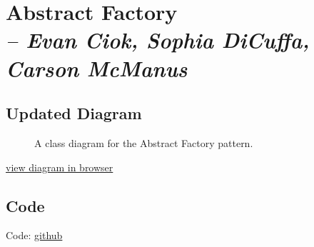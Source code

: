 \chapter{Abstract Factory \\
  \small{\textit{-- Evan Ciok, Sophia DiCuffa, Carson McManus}}
  \label{Chapter::AbstractFactory}}

\section{Updated Diagram}

\begin{figure}[htb]
  \centering
  \caption{\label{Figure::pizzadiagram} A class diagram for the Abstract Factory pattern.}
\end{figure}

\href{https://mermaid.ink/svg/pako:eNrdVslq5DAQ_RWh04R05wM6IZcOAzkkNCQMzOBLRdbIIpZkZBmy9b-PFssjL-3omhhsi1dPtavsd0xUSfEOkxra9oYD0yAKiezlEXTgb29wK5mmJafS_ARilH5F74HjrnNENAVDH6Aj9MfZXHCjOlYtCfYVpe3ill-UMU7bJdGBNg3VSvJFjTWIiB8LmQZy_3s5lK8Xyb7iBJj6LuH4OEZuPxjNJUMSBL20XBNQ7y0q3TNBfXCodc8EDQEg4l8pbt1wZsVlau8JnqfBdmYMPKmXMdDYsOw9BnvHGTX31vdFmVFhcbK2zuM0Jd5UA_9NHVN-qEc-3yUgnz2U9LMtYXFiVlx9bLcnj9_6TrvRiz7Xv3ooooOPFZd73bUm9NJ2-3Ed2moQk-cV-aHuxKMSYFQ4U4Hgl4FwB7a0oGFZGpROYgrUCdi37xR1zTtNSazQVNAf1BSOWThVCnRxcd2bjm6s5HTGXldbx89KhtKBu6pyXMxc5ZMaZ9gZUpxrYrJhVfmoY7INTPoww07fDrkWRnTPi6dsGE9zWRwtM0kypGay8YhxLYo3WFAtgJf2t8TPnAKbigpa4J1d1pxVpsCFPFoidHaevkqCd0Z3dIO7pnTftfAbg3d_oW4tauOzkd31PzrutcENyD9KRc7xH_Gt4iY}{view diagram in browser}

\section{Code}

Code: \href{https://github.com/dyc3/ssw345-group-assignments}{github}